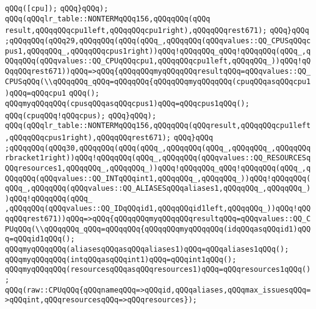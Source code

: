 \verb|qQQq([cpu]);|\newline
\verb|qQQq}qQQq);|\newline
\verb|qQQq(qQQqlr_table::NONTERMqQQq156,qQQqqQQq(qQQq|\newline
\verb|result,qQQqqQQqcpu1left,qQQqqQQqcpu1right),qQQqqQQqrest671);|\newline
\verb|qQQq}qQQq|\newline
\verb|;qQQqqQQq(qQQq29,qQQqqQQq(qQQq(qQQq_,qQQqqQQq(qQQqvalues::QQ_CPUSqQQqcpus1,qQQqqQQq_,qQQqqQQqcpus1right))qQQq!qQQqqQQq_qQQq!qQQqqQQq(qQQq_,qQQqqQQq(qQQqvalues::QQ_CPUqQQqcpu1,qQQqqQQqcpu1left,qQQqqQQq_))qQQq!qQQqqQQqrest671))qQQq=>qQQq{qQQqqQQqmyqQQqqQQqresultqQQq=qQQqvalues::QQ_CPUSqQQq(\\qQQqqQQq_qQQq=qQQqqQQq{qQQqqQQqmyqQQqqQQq(cpuqQQqasqQQqcpu1)qQQq=qQQqcpu1|\newline
\verb|qQQq();|\newline
\verb|qQQqmyqQQqqQQq(cpusqQQqasqQQqcpus1)qQQq=qQQqcpus1qQQq();|\newline
\verb|qQQq(cpuqQQq!qQQqcpus);|\newline
\verb|qQQq}qQQq);|\newline
\verb|qQQq(qQQqlr_table::NONTERMqQQq156,qQQqqQQq(qQQqresult,qQQqqQQqcpu1left,qQQqqQQqcpus1right),qQQqqQQqrest671);|\newline
\verb|qQQq}qQQq|\newline
\verb|;qQQqqQQq(qQQq30,qQQqqQQq(qQQq(qQQq_,qQQqqQQq(qQQq_,qQQqqQQq_,qQQqqQQqrbracket1right))qQQq!qQQqqQQq(qQQq_,qQQqqQQq(qQQqvalues::QQ_RESOURCESqQQqresources1,qQQqqQQq_,qQQqqQQq_))qQQq!qQQqqQQq_qQQq!qQQqqQQq(qQQq_,qQQqqQQq(qQQqvalues::QQ_INTqQQqint1,qQQqqQQq_,qQQqqQQq_))qQQq!qQQqqQQq(qQQq_,qQQqqQQq(qQQqvalues::QQ_ALIASESqQQqaliases1,qQQqqQQq_,qQQqqQQq_))qQQq!qQQqqQQq(qQQq_|\newline
\verb|,qQQqqQQq(qQQqvalues::QQ_IDqQQqid1,qQQqqQQqid1left,qQQqqQQq_))qQQq!qQQqqQQqrest671))qQQq=>qQQq{qQQqqQQqmyqQQqqQQqresultqQQq=qQQqvalues::QQ_CPUqQQq(\\qQQqqQQq_qQQq=qQQqqQQq{qQQqqQQqmyqQQqqQQq(idqQQqasqQQqid1)qQQq=qQQqid1qQQq();|\newline
\verb|qQQqmyqQQqqQQq(aliasesqQQqasqQQqaliases1)qQQq=qQQqaliases1qQQq();|\newline
\verb|qQQqmyqQQqqQQq(intqQQqasqQQqint1)qQQq=qQQqint1qQQq();|\newline
\newline
\verb|qQQqmyqQQqqQQq(resourcesqQQqasqQQqresources1)qQQq=qQQqresources1qQQq();|\newline
\verb|qQQq(raw::CPUqQQq{qQQqnameqQQq=>qQQqid,qQQqaliases,qQQqmax_issuesqQQq=>qQQqint,qQQqresourcesqQQq=>qQQqresources});|\newline
